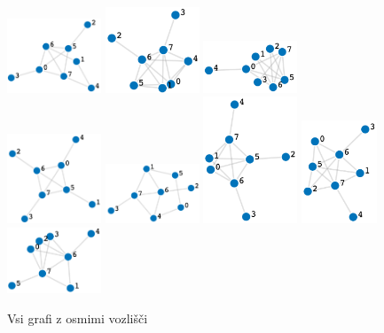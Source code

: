 \documentclass[12pt,a4paper]{amsart}
\theoremstyle{plain} %
\begin{document}
\bigskip
\begin{figure}[h]
    \centering
    \includegraphics[width=0.25\textwidth]{slike/graf1.png}
    \includegraphics[width=0.25\textwidth]{slike/graf2.png}
    \includegraphics[width=0.25\textwidth]{slike/graf3.png}
    \includegraphics[width=0.25\textwidth]{slike/graf4.png}
    \includegraphics[width=0.25\textwidth]{slike/graf5.png}
    \includegraphics[width=0.25\textwidth]{slike/graf6.png}
    \includegraphics[width=0.2\textwidth]{slike/graf7.png}
    \includegraphics[width=0.25\textwidth]{slike/graf8.png}
    \caption{Vsi grafi z osmimi vozlišči}
    \label{fig:slika1}
\end{figure}
\end{document}
